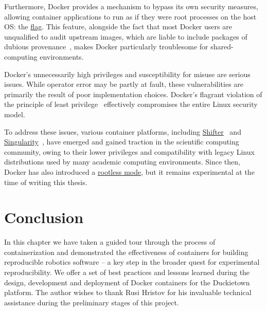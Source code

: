 Furthermore, Docker provides a mechanism to bypass its own security measures, allowing container applications to run as if they were root processes on the host OS: the \href{https://docs.docker.com/engine/reference/run/#security-configuration}{ flag}. This feature, alongside the fact that most Docker users are unqualified to audit upstream images, which are liable to include packages of dubious provenance~\citep{martin2018docker}, makes Docker particularly troublesome for shared-computing environments.

Docker's unnecessarily high privileges and susceptibility for misuse are serious issues. While operator error may be partly at fault, these vulnerabilities are primarily the result of poor implementation choices. Docker's flagrant violation of the principle of least privilege~\citep{saltzer1975protection} effectively compromises the entire Linux security model.

To address these issues, various container platforms, including \href{https://docs.nersc.gov/programming/shifter/overview/}{Shifter}~\citep{gerhardt2017shifter} and \href{https://sylabs.io/docs/}{Singularity}~\citep{kurtzer2017singularity}, have emerged and gained traction in the scientific computing community, owing to their lower privileges and compatibility with legacy Linux distributions used by many academic computing environments. Since then, Docker has also introduced a \href{https://engineering.docker.com/2019/02/experimenting-with-rootless-docker/}{rootless mode}, but it remains experimental at the time of writing this thesis.

\section{Conclusion}

In this chapter we have taken a guided tour through the process of containerization and demonstrated the effectiveness of containers for building reproducible robotics software -- a key step in the broader quest for experimental reproducibility. We offer a set of best practices and lessons learned during the design, development and deployment of Docker containers for the Duckietown~\citep{paull2017duckietown} platform. The author wishes to thank Rusi Hristov for his invaluable technical assistance during the preliminary stages of this project.